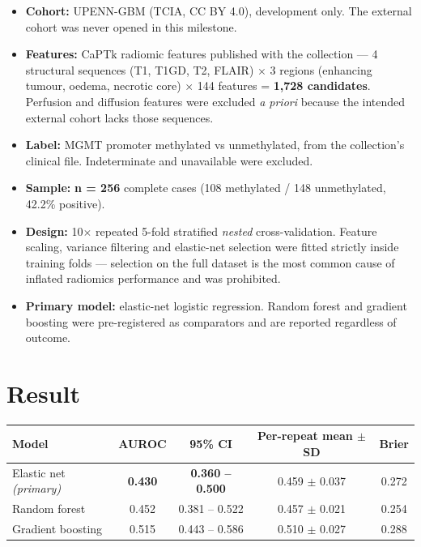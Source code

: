 \documentclass[11pt,a4paper]{article}
\begin{document}
\begin{itemize}[leftmargin=1.4em,nosep]
\item \textbf{Cohort:} UPENN-GBM (TCIA, CC BY 4.0), development only. The external cohort
was never opened in this milestone.
\item \textbf{Features:} CaPTk radiomic features published with the collection ---
4 structural sequences (T1, T1GD, T2, FLAIR) $\times$ 3 regions (enhancing tumour, oedema,
necrotic core) $\times$ 144 features = \textbf{1{,}728 candidates}. Perfusion and diffusion
features were excluded \emph{a priori} because the intended external cohort lacks those
sequences.
\item \textbf{Label:} MGMT promoter methylated vs unmethylated, from the collection's
clinical file. Indeterminate and unavailable were excluded.
\item \textbf{Sample:} \textbf{n = 256} complete cases (108 methylated / 148 unmethylated,
42.2\% positive).
\item \textbf{Design:} 10$\times$ repeated 5-fold stratified \emph{nested} cross-validation.
Feature scaling, variance filtering and elastic-net selection were fitted strictly inside
training folds --- selection on the full dataset is the most common cause of inflated
radiomics performance and was prohibited.
\item \textbf{Primary model:} elastic-net logistic regression. Random forest and gradient
boosting were pre-registered as comparators and are reported regardless of outcome.
\end{itemize}

\section{Result}

\begin{center}
\begin{tabular}{@{}lcccc@{}}
\toprule
\textbf{Model} & \textbf{AUROC} & \textbf{95\% CI} & \textbf{Per-repeat mean $\pm$ SD} &
\textbf{Brier} \\
\midrule
Elastic net \emph{(primary)} & \textbf{0.430} & \textbf{0.360 -- 0.500} & 0.459 $\pm$ 0.037 & 0.272 \\
Random forest & 0.452 & 0.381 -- 0.522 & 0.457 $\pm$ 0.021 & 0.254 \\
Gradient boosting & 0.515 & 0.443 -- 0.586 & 0.510 $\pm$ 0.027 & 0.288 \\
\bottomrule
\end{tabular}
\end{center}
\end{document}
